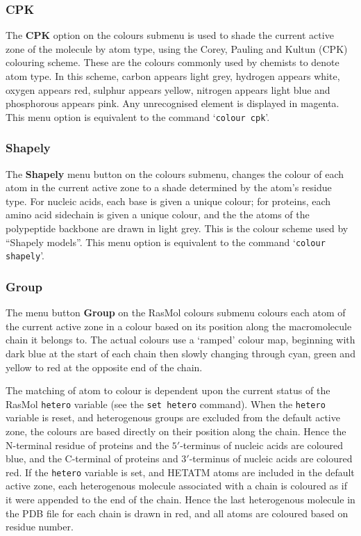 \subsubsection{CPK}
\label{OCPK}
The {\bf CPK} option on the colours submenu is used to shade the current
active zone of the molecule by atom type, using the Corey, Pauling and 
Kultun (CPK) colouring scheme. These are the colours commonly used by
chemists to denote atom type. In this scheme, carbon appears light grey,
hydrogen appears white, oxygen appears red, sulphur appears yellow, 
nitrogen appears light blue and phosphorous appears pink. Any unrecognised 
element is displayed in magenta. This menu option is equivalent to the 
command `{\tt colour cpk}'.


\subsubsection{Shapely}
\label{OShapely}
The {\bf Shapely} menu button on the colours submenu, changes the colour of
each atom in the current active zone to a shade determined by the atom's
residue type. For nucleic acids, each base is given a unique colour;
for proteins, each amino acid sidechain is given a unique colour, and the
the atoms of the polypeptide backbone are drawn in light grey. This is the 
colour scheme used by ``Shapely models''. This menu option is equivalent 
to the command `{\tt colour shapely}'.

\subsubsection{Group}
\label{OGroup}
The menu button {\bf Group} on the RasMol colours submenu colours each
atom of the current active zone in a colour based on its position along
the macromolecule chain it belongs to. The actual colours use a `ramped'
colour map, beginning with dark blue at the start of each chain then slowly
changing through cyan, green and yellow to red at the opposite end of
the chain. 

The matching of atom to colour is dependent upon the current status of the 
RasMol {\tt hetero} variable (see the {\tt set hetero} command). When the
{\tt hetero} variable is reset, and heterogenous groups are 
excluded from the default active zone, the colours are based directly on
their position along the chain. Hence the N-terminal residue of proteins 
and the $5'$-terminus of nucleic acids are coloured blue, and the C-terminal
of proteins and $3'$-terminus of nucleic acids are coloured red. If the 
{\tt hetero} variable is set, and HETATM atoms are included in the default 
active zone, each heterogenous molecule associated with a chain is coloured
as if it were appended to the end of the chain. Hence the last heterogenous 
molecule in the PDB file for each chain is drawn in red, and all atoms are
coloured based on residue number.

